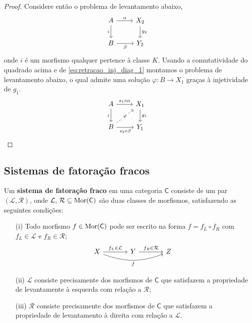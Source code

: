 \begin{proof}
  Considere então o problema de levantamento abaixo,
  \begin{displaymath}
    \begin{tikzcd}
      A
      \arrow[r, "\alpha"]
      \arrow[d, "i" swap]
      & X_2
      \arrow[d, "g_2"]
      \\ B
      \arrow[r, "\beta" swap]
      & Y_2
    \end{tikzcd}
  \end{displaymath}
  onde $i$ é um morfismo qualquer pertence à classe $K$.
  Usando a comutatividade do quadrado acima e de \eqref{eq:retracao_inj_diag_1} montamos o problema de levantamento abaixo, o qual admite uma solução $\varphi: B \to X_1$ graças à injetividade de $g_1$.
  \begin{equation}\label{eq:retracao_inj_diag_3}
    \begin{tikzcd}
      A
      \arrow[r, "s_1 \circ \alpha"]
      \arrow[d, "i" swap]
      & X_1
      \arrow[d, "g_1"]
      \\ B
      \arrow[r, "s_2 \circ \beta" swap]
      \arrow[ru, dashed, "\varphi" description]
      & Y_1
    \end{tikzcd}
  \end{equation}
\end{proof}

\subsection{Sistemas de fatoração fracos}

\begin{defin}
  Um \textbf{sistema de fatoração fraco} em uma categoria $\mathsf{C}$ consiste de um par $(\mathcal{L},\mathcal{R})$, onde $\mathcal{L},\, \mathcal{R} \subseteq \mathrm{Mor}(\mathsf{C})$ são duas classes de morfismos, satisfazendo as seguintes condições:
  \begin{enumerate}
  \item[(i)] Todo morfismo $f \in \mathrm{Mor}(\mathsf{C})$ pode ser escrito na forma $f = f_{L} \circ f_{R}$ com $f_{L} \in \mathcal{L}$ e $f_{R} \in \mathcal{R}$;
    \begin{displaymath}
      \begin{tikzcd}[column sep=1.25cm]
        X
        \arrow[r, "f_{L} \in \mathcal{L}"]
        \arrow[rr, bend right=20, "f" swap]
        & Y
        \arrow[r, "f_{R} \in \mathcal{R}"]
        & Z
      \end{tikzcd}
    \end{displaymath}
    
  \item[(ii)] $\mathcal{L}$ consiste precisamente dos morfismos de $\mathsf{C}$ que satisfazem a propriedade de levantamente à esquerda com relação a $\mathcal{R}$;
    
  \item[(iii)] $\mathcal{R}$ consiste precisamente dos morfismos de $\mathsf{C}$ que satisfazem a propriedade de levantamento à direita com relação a $\mathcal{L}$.
  \end{enumerate}
\end{defin}

